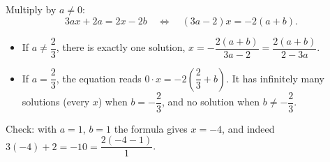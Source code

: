 Multiply by $a\ne0$:
\[
3ax+2a=2x-2b\quad\Longleftrightarrow\quad(3a-2)x=-2(a+b).
\]
\begin{itemize}
\item If $a\ne\dfrac{2}{3}$, there is exactly one solution, $\boxed{x=-\dfrac{2(a+b)}{3a-2}=\dfrac{2(a+b)}{2-3a}}$.
\item If $a=\dfrac{2}{3}$, the equation reads $0\cdot x=-2\left(\dfrac{2}{3}+b\right)$. It has infinitely many solutions (every $x$) when $b=-\dfrac{2}{3}$, and no solution when $b\ne-\dfrac{2}{3}$.
\end{itemize}
Check: with $a=1$, $b=1$ the formula gives $x=-4$, and indeed $3(-4)+2=-10=\dfrac{2(-4-1)}{1}$.
